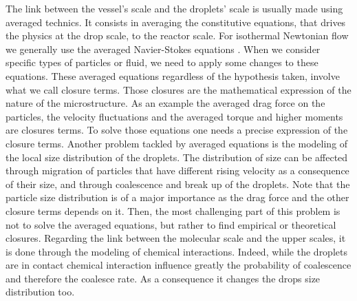The link between the vessel's scale and the droplets' scale is usually made using averaged technics. 
It consists in averaging the constitutive equations, that drives the physics at the drop scale, to the reactor scale. 
For isothermal Newtonian flow we generally use the averaged Navier-Stokes equations \citep{jackson1997locally}. 
When we consider specific types of particles or fluid, we need to apply some changes to these equations. 
These averaged equations regardless of the hypothesis taken, involve what we call closure terms.
Those closures are the mathematical expression of the nature of the microstructure.
As an example the averaged drag force on the particles, the velocity fluctuations and the averaged torque and higher moments are closures terms. 
To solve those equations one needs a precise expression of the closure terms. 
Another problem tackled by averaged equations is the modeling of the local size distribution of the droplets. 
The distribution of size can be affected through migration of particles that have different rising velocity as a consequence of their size, and through coalescence and break up of the droplets. 
Note that the particle size distribution is of a major importance as the drag force and the other closure terms depends on it. 
Then, the most challenging part of this problem is not to solve the averaged equations, but rather to find empirical or theoretical closures. 
Regarding the link between the molecular scale and the upper scales, it is done through the modeling of chemical interactions.
Indeed, while the droplets are in contact chemical interaction influence greatly the probability of coalescence and therefore the coalesce rate. 
As a consequence it changes the drops size distribution too.

